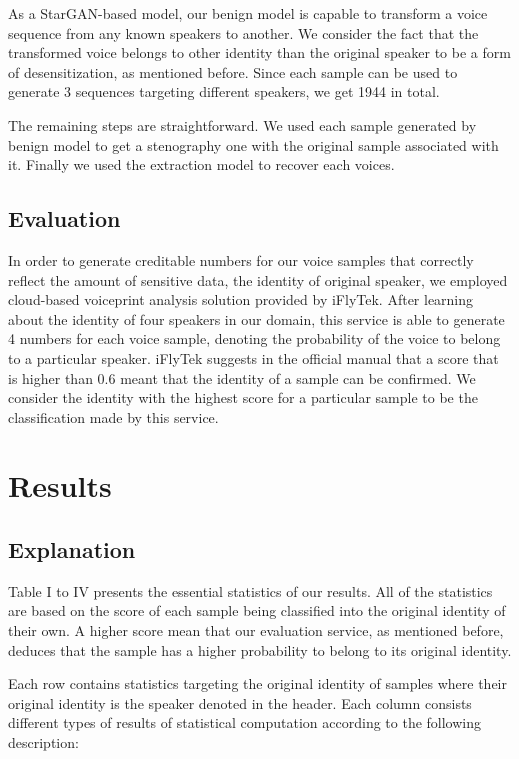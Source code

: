 \documentclass[journal]{IEEEtran} %
\begin{document}
\begin{CJK*}{UTF8}{gbsn}
As a StarGAN-based model, our benign model is capable to transform a voice sequence from any known speakers to another. We consider the fact that the transformed voice belongs to other identity than the original speaker to be a form of desensitization, as mentioned before. Since each sample can be used to generate 3 sequences targeting different speakers, we get 1944 in total.

The remaining steps are straightforward. We used each sample generated by benign model to get a stenography one with the original sample associated with it. Finally we used the extraction model to recover each voices.

\subsection{Evaluation}

In order to generate creditable numbers for our voice samples that correctly reflect the amount of sensitive data, the identity of original speaker, we employed cloud-based voiceprint analysis solution provided by iFlyTek. After learning about the identity of four speakers in our domain, this service is able to generate 4 numbers for each voice sample, denoting the probability of the voice to belong to a particular speaker. iFlyTek suggests in the official manual that a score that is higher than 0.6 meant that the identity of a sample can be confirmed. We consider the identity with the highest score for a particular sample to be the classification made by this service.

\section{Results}

\subsection{Explanation}

Table I to IV presents the essential statistics of our results. All of the statistics are based on the score of each sample being classified into the original identity of their own. A higher score mean that our evaluation service, as mentioned before, deduces that the sample has a higher probability to belong to its original identity.

Each row contains statistics targeting the original identity of samples where their original identity is the speaker denoted in the header. Each column consists different types of results of statistical computation according to the following description:


\end{CJK*}
\end{document}
